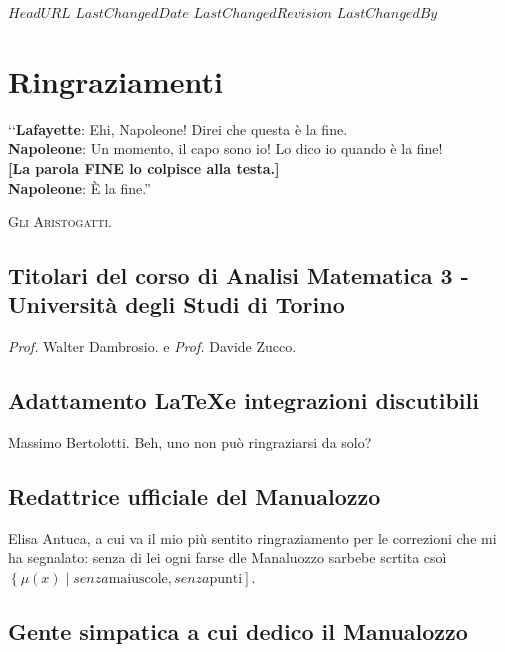 \svnidlong
{$HeadURL$}
{$LastChangedDate$}
{$LastChangedRevision$}
{$LastChangedBy$}

\chapter{Ringraziamenti}

\begin{introduction}
‘‘\textbf{Lafayette}: Ehi, Napoleone! Direi che questa è la fine.\\
\textbf{Napoleone}: Un momento, il capo sono io! Lo dico io quando è la fine!\\
\textbf{[La parola \textsf{FINE} lo colpisce alla testa.]}\\
\textbf{Napoleone}: È la fine.''
\begin{flushright}
	\textsc{Gli Aristogatti.}
\end{flushright}
\end{introduction}

\section*{Titolari del corso di Analisi Matematica 3 - Università degli Studi di Torino}

\textit{Prof.} Walter Dambrosio. e \textit{Prof.} Davide Zucco.

\section*{Adattamento \LaTeX e integrazioni discutibili}
Massimo Bertolotti. Beh, uno non può ringraziarsi da solo?

\section*{Redattrice ufficiale del Manualozzo}
Elisa Antuca, a cui va il mio più sentito ringraziamento per le correzioni che mi ha segnalato: senza di lei ogni farse dle Manaluozzo sarbebe scrtita csoì $\left\{\mu(x) \middle| senza  \text{maiuscole}, senza \text{punti}\right]$.

\section*{Gente simpatica a cui dedico il Manualozzo}


